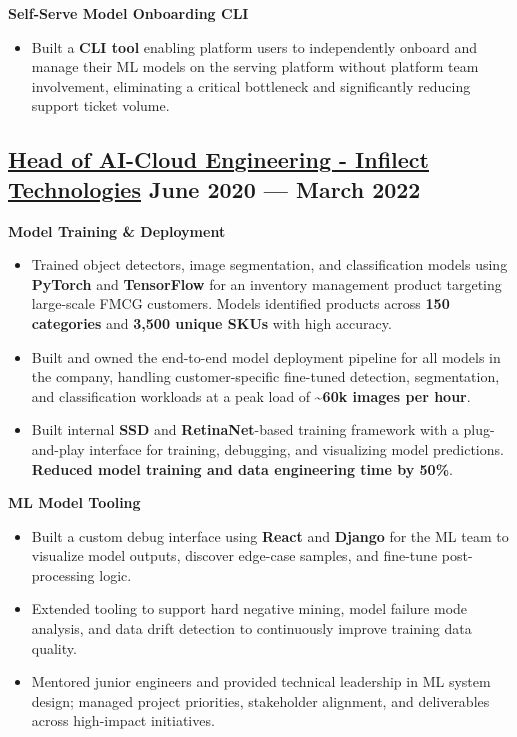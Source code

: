 \documentclass[a4,10pt]{article}
\newenvironment{zitemize}{
\begin{itemize}\itemsep0pt \parskip0pt \parsep1pt}
{\end{itemize}\vspace{-0.5cm}}
\newcommand{\hrole}[2]{{\fontsize{11}{12}\selectfont \textbf{\underline{#1}}  \hfill{#2}}}
\newcommand{\hprojectname}[1]{\vspace{0.4cm}\noindent\textbf{#1}\vspace{-0.1cm}}
\begin{document}
    \hprojectname{Self-Serve Model Onboarding CLI}
    \begin{zitemize}
        \item Built a \textbf{CLI tool} enabling platform users to independently onboard and manage their ML models on the serving platform without platform team involvement, eliminating a critical bottleneck and significantly reducing support ticket volume.
    \end{zitemize}

\subsection{\hrole{Head of AI-Cloud Engineering - Infilect Technologies} {June 2020 --- March 2022}}

    \hprojectname{Model Training \& Deployment}
    \begin{zitemize}
        \item Trained object detectors, image segmentation, and classification models using \textbf{PyTorch} and \textbf{TensorFlow} for an inventory management product targeting large-scale FMCG customers. Models identified products across \textbf{150 categories} and \textbf{3,500 unique SKUs} with high accuracy.
        \item Built and owned the end-to-end model deployment pipeline for all models in the company, handling customer-specific fine-tuned detection, segmentation, and classification workloads at a peak load of \textbf{\textasciitilde60k images per hour}.
        \item Built internal \textbf{SSD} and \textbf{RetinaNet}-based training framework with a plug-and-play interface for training, debugging, and visualizing model predictions. \textbf{Reduced model training and data engineering time by 50\%}.
    \end{zitemize}

    \hprojectname{ML Model Tooling}
    \begin{zitemize}
        \item Built a custom debug interface using \textbf{React} and \textbf{Django} for the ML team to visualize model outputs, discover edge-case samples, and fine-tune post-processing logic.
        \item Extended tooling to support hard negative mining, model failure mode analysis, and data drift detection to continuously improve training data quality.
        \item Mentored junior engineers and provided technical leadership in ML system design; managed project priorities, stakeholder alignment, and deliverables across high-impact initiatives.
    \end{zitemize}
\end{document}
